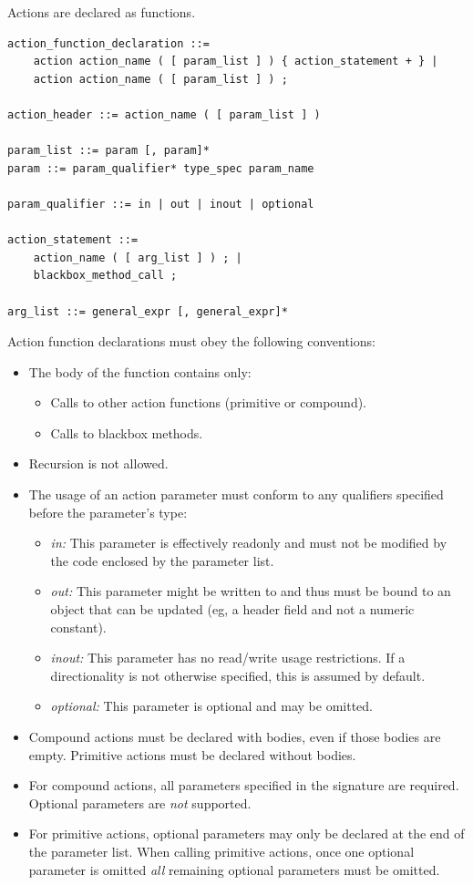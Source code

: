 \documentclass[12pt]{article}
\begin{document}

Actions are declared as functions.

\begin{lstlisting}[style=BNFstyle]
action_function_declaration ::=
    action action_name ( [ param_list ] ) { action_statement + } |
    action action_name ( [ param_list ] ) ;

action_header ::= action_name ( [ param_list ] )

param_list ::= param [, param]*
param ::= param_qualifier* type_spec param_name

param_qualifier ::= in | out | inout | optional

action_statement ::= 
    action_name ( [ arg_list ] ) ; |
    blackbox_method_call ;

arg_list ::= general_expr [, general_expr]*

\end{lstlisting}

Action function declarations must obey the following conventions:

\begin{itemize}
\item
The body of the function contains only:
\begin{itemize}
\item
Calls to other action functions (primitive or compound).
\item
Calls to blackbox methods.
\end{itemize}
\item
Recursion is not allowed.
\item
The usage of an action parameter must conform to any qualifiers specified
before the parameter's type:
\begin{itemize}
\item
\textit{in:} This parameter is effectively readonly and must not be modified
by the code enclosed by the parameter list.
\item
\textit{out:} This parameter might be written to and thus must be bound to an
object that can be updated (eg, a header field and not a numeric constant).
\item
\textit{inout:} This parameter has no read/write usage restrictions. If a
directionality is not otherwise specified, this is assumed by default.
\item
\textit{optional:} This parameter is optional and may be omitted.
\end{itemize}
\item
Compound actions must be declared with bodies, even if those bodies are empty.
Primitive actions must be declared without bodies.
\item
For compound actions, all parameters specified in the signature are required. 
Optional parameters are \textit{not} supported.
\item
For primitive actions, optional parameters may only be declared at the end of
the parameter list. When calling primitive actions, once one optional parameter
is omitted \textit{all} remaining optional parameters must be omitted.
\end{itemize}
\end{document}
